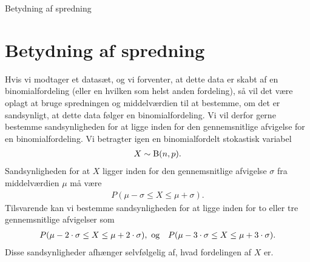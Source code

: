 \begin{center}
\Huge
Betydning af spredning
\end{center}

\section*{Betydning af spredning}

Hvis vi modtager et datasæt, og vi forventer, at dette data er skabt af en binomialfordeling (eller en hvilken som helst anden fordeling), så vil det være oplagt at bruge spredningen og middelværdien til at bestemme, om det er sandsynligt, at dette data følger en binomialfordeling. Vi vil derfor gerne bestemme sandsynligheden for at ligge inden for den gennemsnitlige afvigelse for en binomialfordeling. Vi betragter igen en binomialfordelt stokastisk variabel 
\begin{align*}
X \sim \textnormal{B}(n,p).
\end{align*}
Sandsynligheden for at $X$ ligger inden for den gennemsnitlige afvigelse $\sigma$ fra middelværdien $\mu$ må være
\begin{align*}
P(\mu - \sigma \leq X \leq \mu + \sigma).
\end{align*}
Tilsvarende kan vi bestemme sandsynligheden for at ligge inden for to eller tre gennemsnitlige afvigelser som
\begin{align*}
&P(\mu - 2\cdot \sigma \leq X \leq \mu + 2\cdot \sigma), \textnormal{ og}
&P(\mu - 3\cdot \sigma \leq X \leq \mu + 3\cdot \sigma).
\end{align*}
Disse sandsynligheder afhænger selvfølgelig af, hvad fordelingen af $X$ er. 
